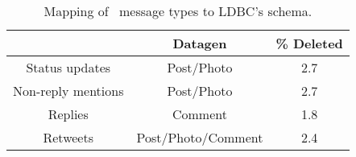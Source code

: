 \begin{table}[H]
  \centering
  \begin{tabular}{ |c|c|c| }
    \hline
    \textbf{\cite{DBLP:conf/cscw/AlmuhimediWLSA13}} & \textbf{Datagen} & \textbf{\% Deleted} \\
    \hline\hline
    Status updates & Post/Photo & 2.7 \\
    \hline
    Non-reply mentions &  Post/Photo & 2.7 \\
    \hline
    Replies & Comment & 1.8 \\
    \hline
    Retweets & Post/Photo/Comment & 2.4 \\
    \hline
  \end{tabular}
  \centering
  \caption{Mapping of~\cite{DBLP:conf/cscw/AlmuhimediWLSA13} message types to LDBC's schema.}
  \label{table:almuhimedi-mapping}
\end{table}
